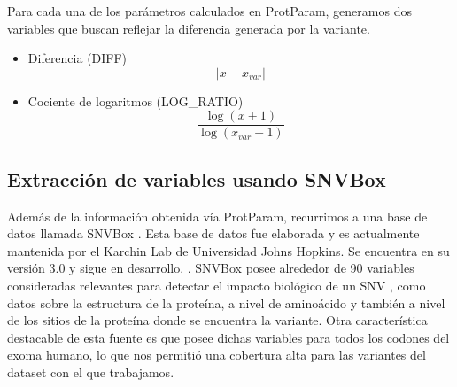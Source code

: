 
Para cada una de los parámetros calculados en ProtParam, generamos dos variables que buscan reflejar la diferencia generada por la variante. 

\begin{itemize}
    \item Diferencia (DIFF) 
    $$|x - x_{var}|$$
    \item Cociente de logaritmos (LOG\_RATIO)
    $$\frac{\log{(x + 1)}}{\log{(x_{var} + 1)}}$$  
\end{itemize}

\subsection{Extracción de variables usando SNVBox}

Además de la información obtenida vía ProtParam, recurrimos a una base de datos llamada SNVBox \todo{[ref]}. Esta base de datos fue elaborada y es actualmente mantenida por el Karchin Lab de Universidad Johns Hopkins. Se encuentra en su versión 3.0 y sigue en desarrollo. . SNVBox posee alrededor de 90 variables consideradas relevantes para detectar el impacto biológico de un SNV \cite{Wong2011}, como datos sobre la estructura de la proteína, a nivel de aminoácido y también a nivel de los sitios de la proteína donde se encuentra la variante. Otra característica destacable de esta fuente es que posee dichas variables para todos los codones del exoma humano, lo que nos permitió una cobertura alta para las variantes del dataset con el que trabajamos. 


